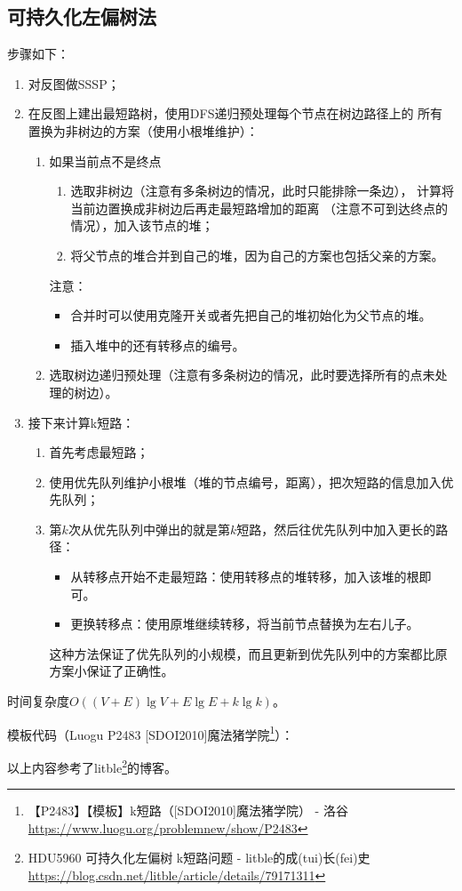 \subsection{可持久化左偏树法}
步骤如下：
\begin{enumerate}
    \item 对反图做SSSP；
    \item 在反图上建出最短路树，使用DFS递归预处理每个节点在树边路径上的
    所有置换为非树边的方案（使用小根堆维护）：
    \begin{enumerate}
        \item 如果当前点不是终点
        \begin{enumerate}
            \item 选取非树边（注意有多条树边的情况，此时只能排除一条边），
            计算将当前边置换成非树边后再走最短路增加的距离
            （注意不可到达终点的情况），加入该节点的堆；
            \item 将父节点的堆合并到自己的堆，因为自己的方案也包括父亲的方案。
        \end{enumerate}
        注意：
        \begin{itemize}
            \item 合并时可以使用克隆开关或者先把自己的堆初始化为父节点的堆。
            \item 插入堆中的还有转移点的编号。
        \end{itemize}

        \item 选取树边递归预处理（注意有多条树边的情况，此时要选择所有的点未处
        理的树边）。
    \end{enumerate}
    \item 接下来计算k短路：
    \begin{enumerate}
        \item 首先考虑最短路；
        \item 使用优先队列维护小根堆（堆的节点编号，距离），把次短路的信息加入优先队列；
        \item 第$k$次从优先队列中弹出的就是第$k$短路，然后往优先队列中加入更长的路径：
        \begin{itemize}
            \item 从转移点开始不走最短路：使用转移点的堆转移，加入该堆的根即可。
            \item 更换转移点：使用原堆继续转移，将当前节点替换为左右儿子。
        \end{itemize}
        这种方法保证了优先队列的小规模，而且更新到优先队列中的方案都比原方案小保证了正确性。
    \end{enumerate}
\end{enumerate}

时间复杂度$O((V+E)\lg V+E \lg E+k \lg k)$。

模板代码（Luogu P2483 [SDOI2010]魔法猪学院\footnote{
【P2483】【模板】k短路（[SDOI2010]魔法猪学院） - 洛谷
\url{https://www.luogu.org/problemnew/show/P2483}
}）：



以上内容参考了litble\footnote{HDU5960 可持久化左偏树 k短路问题 - litble的成(tui)长(fei)史
	\url{https://blog.csdn.net/litble/article/details/79171311}
}的博客。
